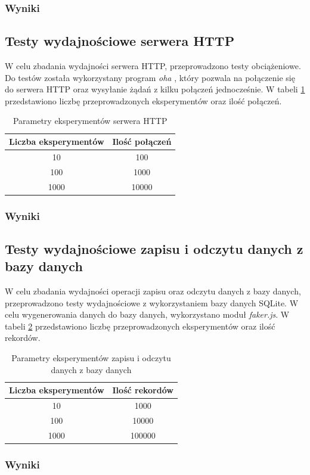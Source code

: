 \subsubsection{Wyniki}

\subsection{Testy wydajnościowe serwera HTTP}
W celu zbadania wydajności serwera HTTP, przeprowadzono testy obciążeniowe. Do testów została wykorzystany program \textit{oha} \cite{oha}, który pozwala na połączenie się do serwera HTTP oraz wysyłanie żądań z kilku połączeń jednocześnie. W tabeli \ref{tab:http_experiments} przedstawiono liczbę przeprowadzonych eksperymentów oraz ilość połączeń.

\begin{table}[H]
  \centering
  \caption{Parametry eksperymentów serwera HTTP}
  \begin{tabular}{|c|c|}
    \hline
    \textbf{Liczba eksperymentów} & \textbf{Ilość połączeń}\\ \hline
    10 & 100 \\ \hline
    100 & 1000 \\ \hline
    1000 & 10000 \\ \hline
  \end{tabular}
  \label{tab:http_experiments}
\end{table}

\subsubsection{Wyniki}

\subsection{Testy wydajnościowe zapisu i odczytu danych z bazy danych}
W celu zbadania wydajności operacji zapisu oraz odczytu danych z bazy danych, przeprowadzono testy wydajnościowe z wykorzystaniem bazy danych SQLite. W celu wygenerowania danych do bazy danych, wykorzystano moduł \textit{faker.js}. W tabeli \ref{tab:database_experiments} przedstawiono liczbę przeprowadzonych eksperymentów oraz ilość rekordów.

\begin{table}
  \centering
  \caption{Parametry eksperymentów zapisu i odczytu danych z bazy danych}
  \begin{tabular}{|c|c|}
    \hline
    \textbf{Liczba eksperymentów} & \textbf{Ilość rekordów}\\ \hline
    10 & 1000 \\ \hline
    100 & 10000 \\ \hline
    1000 & 100000 \\ \hline
  \end{tabular}
  \label{tab:database_experiments}
\end{table}

\subsubsection{Wyniki}
